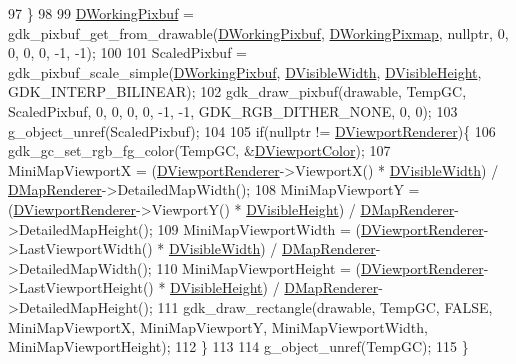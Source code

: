 \begin{DoxyCode}
97     \}
98     
99     \hyperlink{classCMiniMapRenderer_ad5f723d83a60882a3e82af72e84ff522}{DWorkingPixbuf} = gdk\_pixbuf\_get\_from\_drawable(\hyperlink{classCMiniMapRenderer_ad5f723d83a60882a3e82af72e84ff522}{DWorkingPixbuf}, 
      \hyperlink{classCMiniMapRenderer_a53bf622d2048ea136ae256e8d4b81fb5}{DWorkingPixmap}, \textcolor{keyword}{nullptr}, 0, 0, 0, 0, -1, -1);
100     
101     ScaledPixbuf = gdk\_pixbuf\_scale\_simple(\hyperlink{classCMiniMapRenderer_ad5f723d83a60882a3e82af72e84ff522}{DWorkingPixbuf}, 
      \hyperlink{classCMiniMapRenderer_aedcb790a697e6f606cd7fa5089a41359}{DVisibleWidth}, \hyperlink{classCMiniMapRenderer_aad56353e51a1a3da66d3428cf0f1ccf8}{DVisibleHeight}, GDK\_INTERP\_BILINEAR);
102     gdk\_draw\_pixbuf(drawable, TempGC, ScaledPixbuf, 0, 0, 0, 0, -1, -1, GDK\_RGB\_DITHER\_NONE, 0, 0);
103     g\_object\_unref(ScaledPixbuf);
104 
105     \textcolor{keywordflow}{if}(\textcolor{keyword}{nullptr} != \hyperlink{classCMiniMapRenderer_a36d2e3446baba2607129c673311d3420}{DViewportRenderer})\{
106         gdk\_gc\_set\_rgb\_fg\_color(TempGC, &\hyperlink{classCMiniMapRenderer_a6a4f56052a4ced356448f5f1cc9a465e}{DViewportColor});
107         MiniMapViewportX = (\hyperlink{classCMiniMapRenderer_a36d2e3446baba2607129c673311d3420}{DViewportRenderer}->ViewportX() * 
      \hyperlink{classCMiniMapRenderer_aedcb790a697e6f606cd7fa5089a41359}{DVisibleWidth}) / \hyperlink{classCMiniMapRenderer_a6656b208c6b29641a151ea4cbcfda31b}{DMapRenderer}->DetailedMapWidth();
108         MiniMapViewportY = (\hyperlink{classCMiniMapRenderer_a36d2e3446baba2607129c673311d3420}{DViewportRenderer}->ViewportY() * 
      \hyperlink{classCMiniMapRenderer_aad56353e51a1a3da66d3428cf0f1ccf8}{DVisibleHeight}) / \hyperlink{classCMiniMapRenderer_a6656b208c6b29641a151ea4cbcfda31b}{DMapRenderer}->DetailedMapHeight();
109         MiniMapViewportWidth = (\hyperlink{classCMiniMapRenderer_a36d2e3446baba2607129c673311d3420}{DViewportRenderer}->LastViewportWidth() * 
      \hyperlink{classCMiniMapRenderer_aedcb790a697e6f606cd7fa5089a41359}{DVisibleWidth}) / \hyperlink{classCMiniMapRenderer_a6656b208c6b29641a151ea4cbcfda31b}{DMapRenderer}->DetailedMapWidth();
110         MiniMapViewportHeight = (\hyperlink{classCMiniMapRenderer_a36d2e3446baba2607129c673311d3420}{DViewportRenderer}->LastViewportHeight() * 
      \hyperlink{classCMiniMapRenderer_aad56353e51a1a3da66d3428cf0f1ccf8}{DVisibleHeight}) / \hyperlink{classCMiniMapRenderer_a6656b208c6b29641a151ea4cbcfda31b}{DMapRenderer}->DetailedMapHeight();
111         gdk\_draw\_rectangle(drawable, TempGC, FALSE, MiniMapViewportX, MiniMapViewportY, 
      MiniMapViewportWidth,  MiniMapViewportHeight);
112     \}
113     
114     g\_object\_unref(TempGC);
115 \}
\end{DoxyCode}
\hypertarget{classCMiniMapRenderer_a465a10988fd1b47ee1ef223055e1ae65}{}\label{classCMiniMapRenderer_a465a10988fd1b47ee1ef223055e1ae65} 
